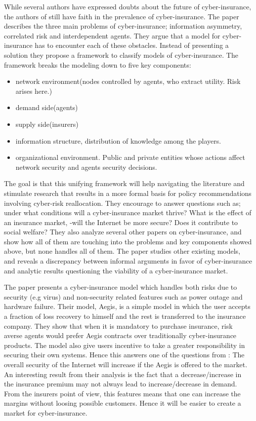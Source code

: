 
While several authors have expressed doubts about the future of cyber-insurance, the authors of \cite{bohme2010modeling} still have faith in the prevalence of cyber-insurance. The paper describes the three main problems of cyber-insurance; information asymmetry, correlated risk and interdependent agents. They argue that a model for cyber-insurance has to encounter each of these obstacles. Instead of presenting a solution they propose a framework to classify models of cyber-insurance. 
The framework breaks the modeling down to five key components: 
\begin{itemize}[topsep=-1em,parsep=0em,itemsep=0em] 
 \item network environment(nodes controlled by agents, who extract utility. Risk arises here.)
 \item demand side(agents) 
 \item supply side(insurers) 
 \item information structure, distribution of knowledge among the players. 
 \item organizational environment. Public and private entities whose actions affect network security and agents security decisions.
 
\end{itemize}


The goal is that this unifying framework will help navigating the literature and stimulate research that results in a more formal basis for policy recommendations involving cyber-risk reallocation. They encourage to answer questions such as; under what conditions will a cyber-insurance market thrive? What is the effect of an insurance market, -will the Internet be more secure? Does it contribute to social welfare?
They also analyze several other papers on cyber-insurance, and show how all of them are touching into the problems and key components showed above, but none handles all of them.
The paper studies other existing models, and reveals a discrepancy between informal arguments in favor of cyber-insurance and analytic results questioning the viability of a cyber-insurance market. 

The paper \cite{pal2011aegis} presents a cyber-insurance model which handles both risks due to security (e.g virus) and non-security related features such as power outage and hardware failure. Their model, Aegis, is a simple model in which the user accepts a fraction of loss recovery to himself and the rest is transferred to the insurance company. They show that when it is mandatory to purchase insurance, risk averse agents would prefer Aegis contracts over traditionally cyber-insurance products.
The model also give users incentive to take a greater responsibility in securing their own systems. Hence this answers one of the questions from \cite{bohme2010modeling}: The overall security of the Internet will increase if the Aegis is offered to the market. An interesting result from their analysis is the fact that a decrease/increase in the insurance premium may not always lead to increase/decrease in demand. From the insurers point of view, this features means that one can increase the margins without loosing possible customers. Hence it will be easier to create a market for cyber-insurance.  

